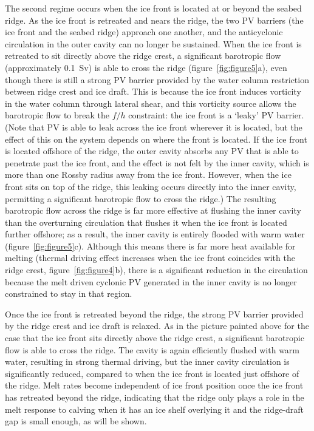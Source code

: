 \documentclass[draft]{agujournal2019}
\begin{document}
The second regime occurs when the ice front is located at or beyond the seabed ridge. As the ice front is retreated and nears the ridge, the two PV barriers (the ice front and the seabed ridge) approach one another, and the anticyclonic circulation in the outer cavity can no longer be sustained.  When the ice front is retreated to sit directly above the ridge crest, a significant barotropic flow (approximately 0.1~Sv) is able to cross the ridge (figure~\ref{fig:figure5}a), even though there is still a strong PV barrier provided by the water column restriction between ridge crest and ice draft. This is because the ice front induces vorticity in the water column through lateral shear, and this vorticity source allows the barotropic flow to break the $f/h$ constraint: the ice front is a `leaky' PV barrier. (Note that PV is able to leak across the ice front wherever it is located, but the effect of this on the system depends on where the front is located. If the ice front is located offshore of the ridge, the outer cavity absorbs any PV that is able to penetrate past the ice front, and the effect is not felt by the inner cavity, which is more than one Rossby radius away from the ice front. However, when the ice front sits on top of the ridge, this leaking occurs directly into the inner cavity, permitting a significant barotropic flow to cross the ridge.) The resulting barotropic flow across the ridge is far more effective at flushing the inner cavity than the overturning circulation that flushes it when the ice front is located further offshore; as a result, the inner cavity is entirely flooded with warm water (figure~\ref{fig:figure5}c). Although this means there is far more heat available for melting (thermal driving effect increases when the ice front coincides with the ridge crest, figure~\ref{fig:figure4}b), there is a significant reduction in the circulation because the melt driven cyclonic PV generated in the inner cavity is no longer constrained to stay in that region.

Once the ice front is retreated beyond the ridge, the strong PV barrier provided by the ridge crest and ice draft is relaxed. As in the picture painted above for the case that the ice front sits directly above the ridge crest, a significant barotropic flow is able to cross the ridge. The cavity is again efficiently flushed with warm water, resulting in strong thermal driving, but the inner cavity circulation is significantly reduced, compared to when the ice front is located just offshore of the ridge. Melt rates become independent of ice front position once the ice front has retreated beyond the ridge, indicating that the ridge only plays a role in the melt response to calving when it has an ice shelf overlying it and the ridge-draft gap is small enough, as will be shown.
\end{document}

